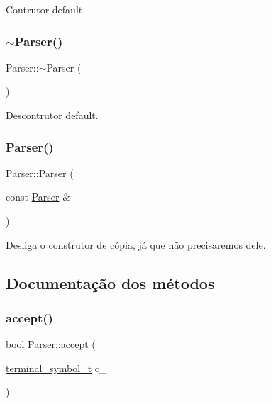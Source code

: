 Contrutor default. 

\mbox{\label{classParser_a95734193a58a199b4c6d820a6a730c42}} 
\subsubsection{\texorpdfstring{$\sim$\+Parser()}{~Parser()}}
{\footnotesize\ttfamily Parser\+::$\sim$\+Parser (\begin{DoxyParamCaption}{ }\end{DoxyParamCaption})\hspace{0.3cm}{\ttfamily [default]}}



Descontrutor default. 

\mbox{\label{classParser_a48044a8caa14a251cb4dad9fb363658e}} 
\subsubsection{\texorpdfstring{Parser()}{Parser()}\hspace{0.1cm}{\footnotesize\ttfamily [2/2]}}
{\footnotesize\ttfamily Parser\+::\+Parser (\begin{DoxyParamCaption}\item[{const \hyperlink{classParser}{Parser} \&}]{ }\end{DoxyParamCaption})\hspace{0.3cm}{\ttfamily [delete]}}



Desliga o construtor de cópia, já que não precisaremos dele. 



\subsection{Documentação dos métodos}
\mbox{\label{classParser_a884775e075317b4b2cfb2016d3654f2a}} 
\subsubsection{\texorpdfstring{accept()}{accept()}}
{\footnotesize\ttfamily bool Parser\+::accept (\begin{DoxyParamCaption}\item[{\hyperlink{classParser_a7d49b050a3c0df9e37ff81c5099be049}{terminal\+\_\+symbol\+\_\+t}}]{c\+\_\+ }\end{DoxyParamCaption})\hspace{0.3cm}{\ttfamily [private]}}



